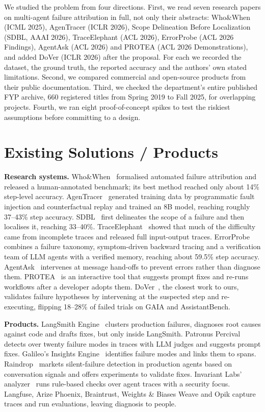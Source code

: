 \documentclass{fast-nuces-bs}
\begin{document}
We studied the problem from four directions. First, we read seven research papers on multi-agent failure attribution in full, not only their abstracts: Who\&When (ICML 2025), AgenTracer (ICLR 2026), Scope Delineation Before Localization (SDBL, AAAI 2026), TraceElephant (ACL 2026), ErrorProbe (ACL 2026 Findings), AgentAsk (ACL 2026) and PROTEA (ACL 2026 Demonstrations), and added DoVer (ICLR 2026) after the proposal. For each we recorded the dataset, the ground truth, the reported accuracy and the authors' own stated limitations. Second, we compared commercial and open-source products from their public documentation. Third, we checked the department's entire published FYP archive, 660 registered titles from Spring 2019 to Fall 2025, for overlapping projects. Fourth, we ran eight proof-of-concept spikes to test the riskiest assumptions before committing to a design.

\section{Existing Solutions / Products}

\textbf{Research systems.} Who\&When~\cite{whowhen} formalised automated failure attribution and released a human-annotated benchmark; its best method reached only about 14\% step-level accuracy. AgenTracer~\cite{agentracer} generated training data by programmatic fault injection and counterfactual replay and trained an 8B model, reaching roughly 37--43\% step accuracy. SDBL~\cite{sdbl} first delineates the scope of a failure and then localises it, reaching 33--40\%. TraceElephant~\cite{traceelephant} showed that much of the difficulty came from incomplete traces and released full input-output traces. ErrorProbe~\cite{errorprobe} combines a failure taxonomy, symptom-driven backward tracing and a verification team of LLM agents with a verified memory, reaching about 59.5\% step accuracy. AgentAsk~\cite{agentask} intervenes at message hand-offs to prevent errors rather than diagnose them. PROTEA~\cite{protea} is an interactive tool that suggests prompt fixes and re-runs workflows after a developer adopts them. DoVer~\cite{dover}, the closest work to ours, validates failure hypotheses by intervening at the suspected step and re-executing, flipping 18--28\% of failed trials on GAIA and AssistantBench.

\textbf{Products.} LangSmith Engine~\cite{langsmith} clusters production failures, diagnoses root causes against code and drafts fixes, but only inside LangSmith. Patronus Percival~\cite{percival} detects over twenty failure modes in traces with LLM judges and suggests prompt fixes. Galileo's Insights Engine~\cite{galileo} identifies failure modes and links them to spans. Raindrop~\cite{raindrop} markets silent-failure detection in production agents based on conversation signals and offers experiments to validate fixes. Invariant Labs' analyzer~\cite{invariant} runs rule-based checks over agent traces with a security focus. Langfuse, Arize Phoenix, Braintrust, Weights \& Biases Weave and Opik capture traces and run evaluations, leaving diagnosis to people.
\end{document}
